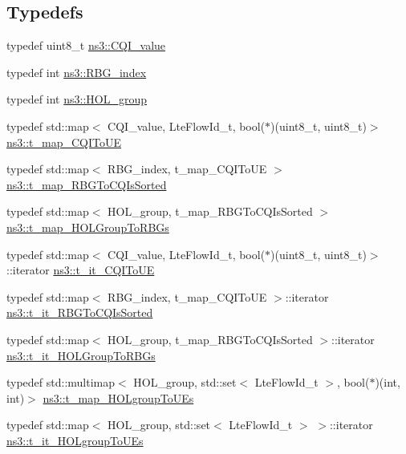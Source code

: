 \subsection*{Typedefs}
\begin{DoxyCompactItemize}
\item 
typedef uint8\+\_\+t \hyperlink{namespacens3_aefc25127c04d05aa835ebea86ab26863}{ns3\+::\+C\+Q\+I\+\_\+value}
\item 
typedef int \hyperlink{namespacens3_a0240e885748c919ec66b2d855bf6dbdf}{ns3\+::\+R\+B\+G\+\_\+index}
\item 
typedef int \hyperlink{namespacens3_a3eb49417915685586eb40ed071e05d49}{ns3\+::\+H\+O\+L\+\_\+group}
\item 
typedef std\+::map$<$ C\+Q\+I\+\_\+value, Lte\+Flow\+Id\+\_\+t, bool($\ast$)(uint8\+\_\+t, uint8\+\_\+t)$>$ \hyperlink{namespacens3_a8888e4961bdcd73e4ed028990dd3985b}{ns3\+::t\+\_\+map\+\_\+\+C\+Q\+I\+To\+UE}
\item 
typedef std\+::map$<$ R\+B\+G\+\_\+index, t\+\_\+map\+\_\+\+C\+Q\+I\+To\+UE $>$ \hyperlink{namespacens3_af02b4b59dc5e493277d0d496dfd567cc}{ns3\+::t\+\_\+map\+\_\+\+R\+B\+G\+To\+C\+Q\+Is\+Sorted}
\item 
typedef std\+::map$<$ H\+O\+L\+\_\+group, t\+\_\+map\+\_\+\+R\+B\+G\+To\+C\+Q\+Is\+Sorted $>$ \hyperlink{namespacens3_a2f4c4ccac37307eb8f2f571a689c54bd}{ns3\+::t\+\_\+map\+\_\+\+H\+O\+L\+Group\+To\+R\+B\+Gs}
\item 
typedef std\+::map$<$ C\+Q\+I\+\_\+value, Lte\+Flow\+Id\+\_\+t, bool($\ast$)(uint8\+\_\+t, uint8\+\_\+t)$>$\+::iterator \hyperlink{namespacens3_a249153e1e39d826beb847fe1bc69282b}{ns3\+::t\+\_\+it\+\_\+\+C\+Q\+I\+To\+UE}
\item 
typedef std\+::map$<$ R\+B\+G\+\_\+index, t\+\_\+map\+\_\+\+C\+Q\+I\+To\+UE $>$\+::iterator \hyperlink{namespacens3_a885b83c367459661c0e280e8b40c2597}{ns3\+::t\+\_\+it\+\_\+\+R\+B\+G\+To\+C\+Q\+Is\+Sorted}
\item 
typedef std\+::map$<$ H\+O\+L\+\_\+group, t\+\_\+map\+\_\+\+R\+B\+G\+To\+C\+Q\+Is\+Sorted $>$\+::iterator \hyperlink{namespacens3_a81a37bf7e230dc9aaa9e6a7496dbb86a}{ns3\+::t\+\_\+it\+\_\+\+H\+O\+L\+Group\+To\+R\+B\+Gs}
\item 
typedef std\+::multimap$<$ H\+O\+L\+\_\+group, std\+::set$<$ Lte\+Flow\+Id\+\_\+t $>$, bool($\ast$)(int, int)$>$ \hyperlink{namespacens3_a92550c655e7599f3bc33c3ce363efc7a}{ns3\+::t\+\_\+map\+\_\+\+H\+O\+Lgroup\+To\+U\+Es}
\item 
typedef std\+::map$<$ H\+O\+L\+\_\+group, std\+::set$<$ Lte\+Flow\+Id\+\_\+t $>$ $>$\+::iterator \hyperlink{namespacens3_afe18eb1d0bcd25c77f1dcb8cf7648b32}{ns3\+::t\+\_\+it\+\_\+\+H\+O\+Lgroup\+To\+U\+Es}
\end{DoxyCompactItemize}

